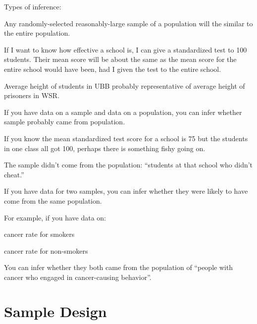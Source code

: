 \documentclass[landscape]{exam}
\begin{document}
  Types of inference:
  \begin{itemize*}


    \item Any randomly-selected reasonably-large sample of a population will the
      similar to the entire population.
      
      If I want to know how effective a school is, I can give a standardized
      test to 100 students. Their mean score will be about the same as the mean
      score for the entire school would have been, had I given the test to the
      entire school.

      Average height of students in UBB probably representative of average
      height of prisoners in WSR\@.

    \item If you have data on a sample and data on a population, you can infer
      whether sample probably came from population. 

      If you know the mean standardized test score for a school is 75 but the
      students in one class all got 100, perhaps there is something fishy going
      on.

      The sample didn't come from the population: ``students at that school who
      didn't cheat.''

    \item If you have data for two samples, you can infer whether they were
      likely to have come from the same population. 

      For example, if you have data on:
      \begin{itemize*}
        \item cancer rate for smokers
        \item cancer rate for non-smokers
      \end{itemize*}

      You can infer whether they both came from the population of ``people with
      cancer who engaged in cancer-causing behavior''.

  \end{itemize*}

  \section{Sample Design}
\end{document}
